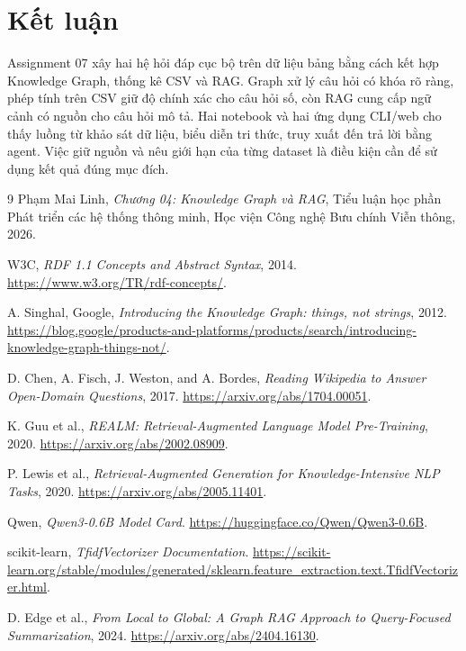 \documentclass[12pt,a4paper]{report}
\begin{document}
\section{Kết luận}
Assignment 07 xây hai hệ hỏi đáp cục bộ trên dữ liệu bảng bằng cách kết hợp Knowledge Graph,
thống kê CSV và RAG. Graph xử lý câu hỏi có khóa rõ ràng, phép tính trên CSV giữ độ chính xác cho
câu hỏi số, còn RAG cung cấp ngữ cảnh có nguồn cho câu hỏi mô tả. Hai notebook và hai ứng dụng CLI/web
cho thấy luồng từ khảo sát dữ liệu, biểu diễn tri thức, truy xuất đến trả lời bằng agent. Việc giữ
nguồn và nêu giới hạn của từng dataset là điều kiện cần để sử dụng kết quả đúng mục đích.

\begin{thebibliography}{9}
Phạm Mai Linh, \emph{Chương 04: Knowledge Graph và RAG},
Tiểu luận học phần Phát triển các hệ thống thông minh,
Học viện Công nghệ Bưu chính Viễn thông, 2026.

W3C, \emph{RDF 1.1 Concepts and Abstract Syntax}, 2014.
\url{https://www.w3.org/TR/rdf-concepts/}.

A. Singhal, Google, \emph{Introducing the Knowledge Graph: things, not strings}, 2012.
\url{https://blog.google/products-and-platforms/products/search/introducing-knowledge-graph-things-not/}.

D. Chen, A. Fisch, J. Weston, and A. Bordes,
\emph{Reading Wikipedia to Answer Open-Domain Questions}, 2017.
\url{https://arxiv.org/abs/1704.00051}.

K. Guu et al., \emph{REALM: Retrieval-Augmented Language Model Pre-Training}, 2020.
\url{https://arxiv.org/abs/2002.08909}.

P. Lewis et al., \emph{Retrieval-Augmented Generation for Knowledge-Intensive NLP Tasks}, 2020.
\url{https://arxiv.org/abs/2005.11401}.

Qwen, \emph{Qwen3-0.6B Model Card}.
\url{https://huggingface.co/Qwen/Qwen3-0.6B}.

scikit-learn, \emph{TfidfVectorizer Documentation}.
\url{https://scikit-learn.org/stable/modules/generated/sklearn.feature_extraction.text.TfidfVectorizer.html}.

D. Edge et al., \emph{From Local to Global: A Graph RAG Approach to Query-Focused Summarization}, 2024.
\url{https://arxiv.org/abs/2404.16130}.
\end{thebibliography}
\end{document}
